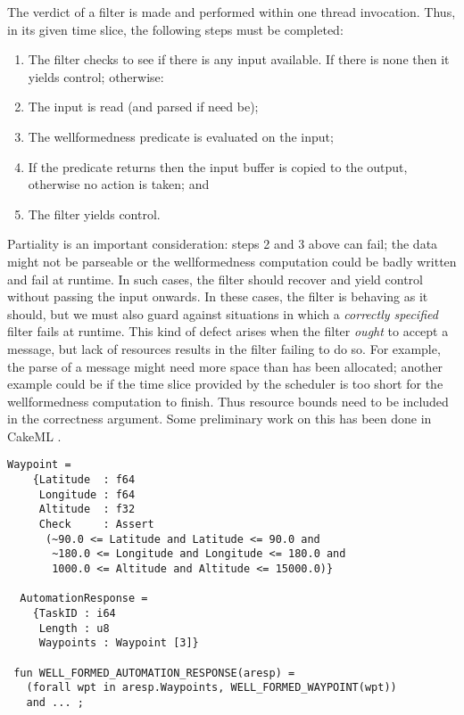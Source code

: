 The verdict of a filter is made and performed within one thread
invocation. Thus, in its given time slice, the
following steps must be completed:

\begin{enumerate}

\item The filter checks to see if there is any input available.  If there is none
then it yields control; otherwise:

\item The input is read (and parsed if need be);

\item The wellformedness predicate is evaluated on the input;

\item If the predicate returns  then the input buffer
 is copied to the output, otherwise no action is taken; and

\item The filter yields control.
\end{enumerate}

\begin{remark}[Partiality]

Partiality is an important consideration: steps 2 and 3 above can
fail; the data might not be parseable or the wellformedness
computation could be badly written and fail at runtime. In such cases,
the filter should recover and yield control without passing the input
onwards. In these cases, the filter is behaving as it should, but we
must also guard against situations in which a \emph{correctly
specified} filter fails at runtime. This kind of defect arises when
the filter \emph{ought} to accept a message, but lack of resources
results in the filter failing to do so. For example, the parse of a
message might need more space than has been allocated; another example
could be if the time slice provided by the scheduler is too short for
the wellformedness computation to finish. Thus resource bounds need to
be included in the correctness argument. Some preliminary work on this
has been done in CakeML \cite{cakeml-space-cost}.

\end{remark}


\newsavebox{\contig}
\begin{lrbox}{\contig}
\begin{lstlisting}[style=myML]
  Waypoint =
    {Latitude  : f64
     Longitude : f64
     Altitude  : f32
     Check     : Assert
      (~90.0 <= Latitude and Latitude <= 90.0 and
       ~180.0 <= Longitude and Longitude <= 180.0 and
       1000.0 <= Altitude and Altitude <= 15000.0)}

  AutomationResponse =
    {TaskID : i64
     Length : u8
     Waypoints : Waypoint [3]}

 fun WELL_FORMED_AUTOMATION_RESPONSE(aresp) =
   (forall wpt in aresp.Waypoints, WELL_FORMED_WAYPOINT(wpt))
   and ... ;
\end{lstlisting}
\end{lrbox}

